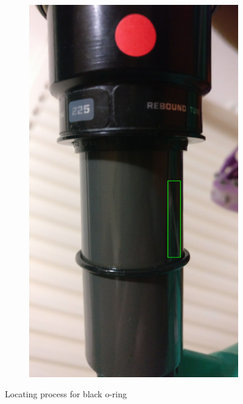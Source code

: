 \begin{figure}[h!]
\begin{subfigure}[t]{0.4\textwidth}
				\includegraphics[scale=0.04]{../images/results/fox_oring.jpg}	
				\label{subfig:fox_oring}
			\end{subfigure}
			\caption{Locating process for black o-ring}
			\label{fig:fox_oring}
		\end{figure}
